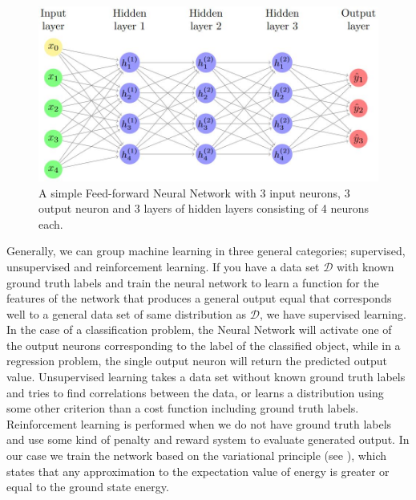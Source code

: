 \begin{figure}[htbp]
  \centering
  \includegraphics[scale=0.5]{Images/DFFNN.JPG}
  \caption{A simple Feed-forward Neural Network with 3 input neurons, 3 output neuron and 3 layers of hidden layers consisting of 4 neurons each.}
  \label{fig:NN}
\end{figure}

Generally, we can group machine learning in three general categories; supervised, unsupervised and reinforcement learning. If you have a data set $\mathcal{D}$ with known ground truth labels and train the neural network to learn a function for the features of the network that produces a general output equal that corresponds well to a general data set of same distribution as $\mathcal{D}$, we have supervised learning. In the case of a classification problem, the Neural Network will activate one of the output neurons corresponding to the label of the classified object, while in a regression problem, the single output neuron will return the predicted output value. Unsupervised learning takes a data set without known ground truth labels and tries to find correlations between the data, or learns a distribution using some other criterion than a cost function including ground truth labels. Reinforcement learning is performed when we do not have ground truth labels and use some kind of penalty and reward system to evaluate generated output. In our case we train the network based on the variational principle (see \citep{project1}), which states that any approximation to the expectation value of energy is greater or equal to the ground state energy. 

